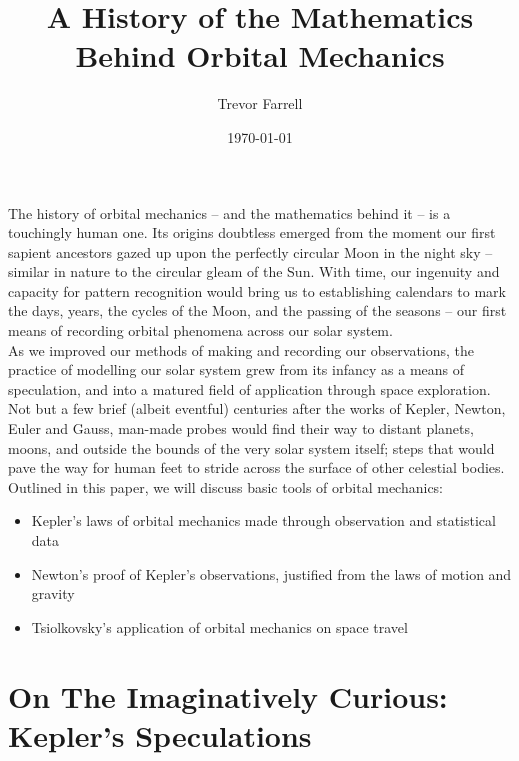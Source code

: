 \documentclass{article}
\title{A History of the Mathematics Behind Orbital Mechanics}
\author{Trevor Farrell}
\date{\today}
\begin{document}
\maketitle

The history of orbital mechanics -- and the mathematics behind it -- is a touchingly human one. Its origins doubtless emerged from the moment our first sapient ancestors gazed up upon the perfectly circular Moon in the night sky -- similar in nature to the circular gleam of the Sun. With time, our ingenuity and capacity for pattern recognition would bring us to establishing calendars to mark the days, years, the cycles of the Moon, and the passing of the seasons -- our first means of recording orbital phenomena across our solar system. \\ 

As we improved our methods of making and recording our observations, the practice of modelling our solar system grew from its infancy as a means of speculation, and into a matured field of application through space exploration. Not but a few brief (albeit eventful) centuries after the works of Kepler, Newton, Euler and Gauss, man-made probes would find their way to distant planets, moons, and outside the bounds of the very solar system itself; steps that would pave the way for human feet to stride across the surface of other celestial bodies. \\

Outlined in this paper, we will discuss basic tools of orbital mechanics:

\begin{itemize}
    \item Kepler's laws of orbital mechanics made through observation and statistical data
    \item Newton's proof of Kepler's observations, justified from the laws of motion and gravity
    \item Tsiolkovsky's application of orbital mechanics on space travel
\end{itemize}

\section{On The Imaginatively Curious: Kepler's Speculations}
\end{document}
